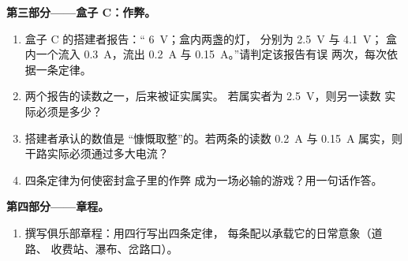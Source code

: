 \begin{problem}
\medskip\noindent\textbf{第三部分——盒子 C：作弊。}
\begin{enumerate}[resume]
  \item 盒子 C 的搭建者报告：“ \qty{6}{V}；盒内两盏的灯，
        分别为 \qty{2.5}{V} 与 \qty{4.1}{V}；
        盒内一个流入 \qty{0.3}{A}，流出
        \qty{0.2}{A} 与 \qty{0.15}{A}。”请判定该报告有误
        两次，每次依据一条定律。
  \item 两个报告的读数之一，后来被证实属实。
        若属实者为 \qty{2.5}{V}，则另一读数
        实际必须是多少？
  \item 搭建者承认的数值是
        “慷慨取整”的。若两条的读数
        \qty{0.2}{A} 与 \qty{0.15}{A} 属实，则
        干路实际必须通过多大电流？
  \item 四条定律为何使密封盒子里的作弊
        成为一场必输的游戏？用一句话作答。
\end{enumerate}

\medskip\noindent\textbf{第四部分——章程。}
\begin{enumerate}[resume]
  \item 撰写俱乐部章程：用四行写出四条定律，
        每条配以承载它的日常意象（道路、
        收费站、瀑布、岔路口）。
\end{enumerate}
\end{problem}
